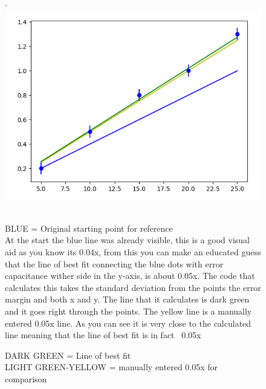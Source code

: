 \documentclass[10pt, twocolumn, twoside]{article}
\begin{document}
\begin{figure}[ht] .
\includegraphics[width=\columnwidth]{CaptureWEAK3.PNG}
\caption[width=\columnwidth]{DARK GREEN = Line of best fit \\
LIGHT GREEN-YELLOW = manually entered 0.05x for comparison} \\
BLUE = Original starting point for reference \\
At the start the blue line was already visible, this is a good visual aid as you know its 0.04x, from this you can make an educated guess that the line of best fit connecting the blue dots with error capacitance wither side in the y-axis, is about 0.05x. The code that calculates this takes the standard deviation from the points the error margin and both x and y. The line that it calculates is dark green and it goes right through the points. The yellow line is a manually entered 0.05x line. As you can see it is very close to the calculated line meaning that the line of best fit is in fact ~0.05x
\end{figure}
\end{document}
